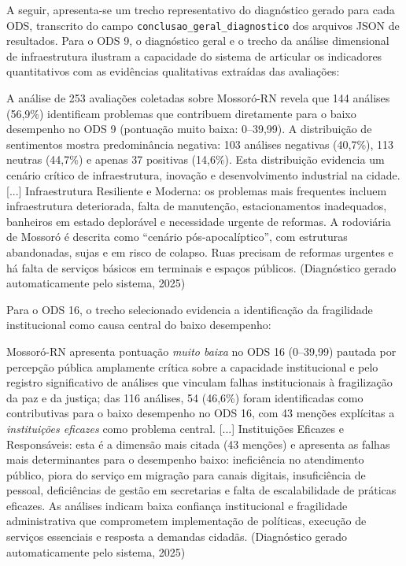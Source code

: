 A seguir, apresenta-se um trecho representativo do diagnóstico gerado para cada ODS, transcrito do campo \texttt{conclusao\_geral\_diagnostico} dos arquivos JSON de resultados. Para o ODS 9, o diagnóstico geral e o trecho da análise dimensional de infraestrutura ilustram a capacidade do sistema de articular os indicadores quantitativos com as evidências qualitativas extraídas das avaliações:

\begin{citacao}
A análise de 253 avaliações coletadas sobre Mossoró-RN revela que 144 análises (56,9\%) identificam problemas que contribuem diretamente para o baixo desempenho no ODS 9 (pontuação muito baixa: 0--39,99). A distribuição de sentimentos mostra predominância negativa: 103 análises negativas (40,7\%), 113 neutras (44,7\%) e apenas 37 positivas (14,6\%). Esta distribuição evidencia um cenário crítico de infraestrutura, inovação e desenvolvimento industrial na cidade. [...] Infraestrutura Resiliente e Moderna: os problemas mais frequentes incluem infraestrutura deteriorada, falta de manutenção, estacionamentos inadequados, banheiros em estado deplorável e necessidade urgente de reformas. A rodoviária de Mossoró é descrita como ``cenário pós-apocalíptico'', com estruturas abandonadas, sujas e em risco de colapso. Ruas precisam de reformas urgentes e há falta de serviços básicos em terminais e espaços públicos. (Diagnóstico gerado automaticamente pelo sistema, 2025)
\end{citacao}

Para o ODS 16, o trecho selecionado evidencia a identificação da fragilidade institucional como causa central do baixo desempenho:

\begin{citacao}
Mossoró-RN apresenta pontuação \textit{muito baixa} no ODS 16 (0--39,99) pautada por percepção pública amplamente crítica sobre a capacidade institucional e pelo registro significativo de análises que vinculam falhas institucionais à fragilização da paz e da justiça; das 116 análises, 54 (46,6\%) foram identificadas como contributivas para o baixo desempenho no ODS 16, com 43 menções explícitas a \textit{instituições eficazes} como problema central. [...] Instituições Eficazes e Responsáveis: esta é a dimensão mais citada (43 menções) e apresenta as falhas mais determinantes para o desempenho baixo: ineficiência no atendimento público, piora do serviço em migração para canais digitais, insuficiência de pessoal, deficiências de gestão em secretarias e falta de escalabilidade de práticas eficazes. As análises indicam baixa confiança institucional e fragilidade administrativa que comprometem implementação de políticas, execução de serviços essenciais e resposta a demandas cidadãs. (Diagnóstico gerado automaticamente pelo sistema, 2025)
\end{citacao}

